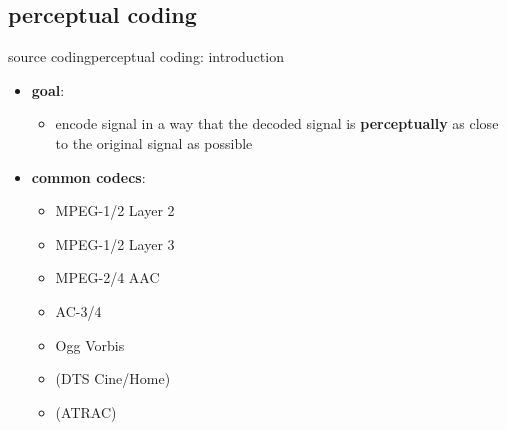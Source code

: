 \subsection{perceptual coding}	
	\begin{frame}{source coding}{perceptual coding: introduction}
        \begin{itemize}
            \item   \textbf{goal}: 
                \begin{itemize}
                    \item   encode signal in a way that the decoded signal is \textbf{perceptually} as close to the original signal as possible
                \end{itemize}
            \pause
            \bigskip
            \item   \textbf{common codecs}:
                \begin{itemize}
                    \item   MPEG-1/2 Layer 2
                    \item   MPEG-1/2 Layer 3
                    \item   %
                    MPEG-2/4 AAC
                    \item   AC-3/4
                    \item   Ogg Vorbis
                    \item   (DTS  Cine/Home)
                    \item   (ATRAC)
                \end{itemize}
        \end{itemize}
	\end{frame}
